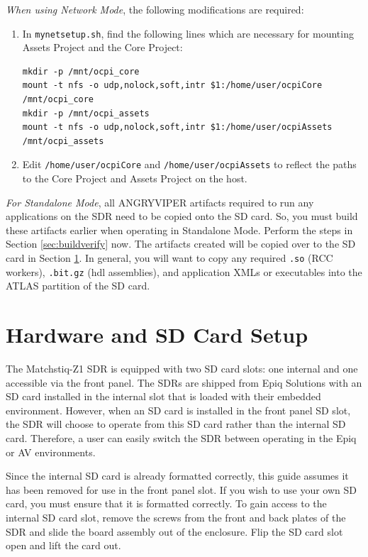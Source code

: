 \begin{flushleft}
\textit{When using Network Mode}, the following modifications are required:
\end{flushleft}

\begin{enumerate}
\item In \texttt{mynetsetup.sh}, find the following lines which are necessary for mounting Assets Project and the Core Project:
\begin{verbatim}
mkdir -p /mnt/ocpi_core
mount -t nfs -o udp,nolock,soft,intr $1:/home/user/ocpiCore /mnt/ocpi_core
mkdir -p /mnt/ocpi_assets
mount -t nfs -o udp,nolock,soft,intr $1:/home/user/ocpiAssets /mnt/ocpi_assets
\end{verbatim}
 \item Edit \texttt{/home/user/ocpiCore} and \texttt{/home/user/ocpiAssets} to reflect the paths to the Core Project and Assets Project on the host.
\end{enumerate}
\begin{flushleft}
\label{sec:buildNow}
\textit{For Standalone Mode}, all ANGRYVIPER artifacts required to run any applications on the SDR need to be copied onto the SD card.  So, you must build these artifacts earlier when operating in Standalone Mode. Perform the steps in Section \ref{sec:buildverify}  now. The artifacts created will be copied over to the SD card in Section \ref{sec:HW_Setup}. In general, you will want to copy any required \texttt{.so} (RCC workers), \texttt{.bit.gz} (hdl assemblies), and application XMLs or executables into the ATLAS partition of the SD card.
\end{flushleft}
\section{Hardware and SD Card Setup}
\label{sec:HW_Setup}
The Matchstiq-Z1 SDR is equipped with two SD card slots: one internal and one accessible via the front panel. The SDRs are shipped from Epiq Solutions with an SD card installed in the internal slot that is loaded with their embedded environment. However, when an SD card is installed in the front panel SD slot, the SDR will choose to operate from this SD card rather than the internal SD card. Therefore, a user can easily switch the SDR between operating in the Epiq or AV environments.
\begin{flushleft}
Since the internal SD card is already formatted correctly, this guide assumes it has been removed for use in the front panel slot. If you wish to use your own SD card, you must ensure that it is formatted correctly. To gain access to the internal SD card slot, remove the screws from the front and back plates of the SDR and slide the board assembly out of the enclosure. Flip the SD card slot open and lift the card out.
\end{flushleft}
